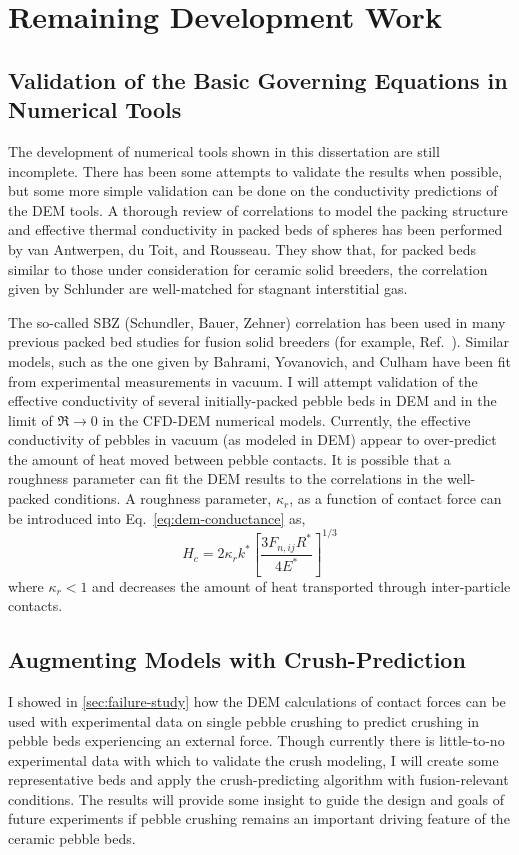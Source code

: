 \section{Remaining Development Work}
\subsection{Validation of the Basic Governing Equations in Numerical Tools}

The development of numerical tools shown in this dissertation are still incomplete. There has been some attempts to validate the results when possible, but some more simple validation can be done on the conductivity predictions of the DEM tools. A thorough review of correlations to model the packing structure and effective thermal conductivity in packed beds of spheres has been performed by van Antwerpen, du Toit, and Rousseau.\cite{VanAntwerpen2010} They show that, for packed beds similar to those under consideration for ceramic solid breeders, the correlation given by Schlunder\etal\cite{bauer1978effective,Zehner1972} are well-matched for stagnant interstitial gas. 

The so-called SBZ (Schundler, Bauer, Zehner) correlation has been used in many previous packed bed studies for fusion solid breeders (for example, Ref.~\cite{Abou-Sena:2007ff}). Similar models, such as the one given by Bahrami, Yovanovich, and Culham have been fit from experimental measurements in vacuum.\cite{Bahrami20063691} I will attempt validation of the effective conductivity of several initially-packed pebble beds in DEM and in the limit of $\Re \rightarrow 0$ in the CFD-DEM numerical models. Currently, the effective conductivity of pebbles in vacuum (as modeled in DEM) appear to over-predict the amount of heat moved between pebble contacts. It is possible that a roughness parameter can fit the DEM results to the correlations in the well-packed conditions. A roughness parameter, $\kappa_r$, as a function of contact force can be introduced into Eq.~\ref{eq:dem-conductance} as,
\begin{equation}
	H_c = 2\kappa_rk^*\left[\frac{3F_{n,ij}R^*}{4E^*}\right]^{1/3}
\end{equation}
where $\kappa_r < 1$ and decreases the amount of heat transported through inter-particle contacts.

\subsection{Augmenting Models with Crush-Prediction}
I showed in \cref{sec:failure-study} how the DEM calculations of contact forces can be used with experimental data on single pebble crushing to predict crushing in pebble beds experiencing an external force. Though currently there is little-to-no experimental data with which to validate the crush modeling, I will create some representative beds and apply the crush-predicting algorithm with fusion-relevant conditions. The results will provide some insight to guide the design and goals of future experiments if pebble crushing remains an important driving feature of the ceramic pebble beds.

